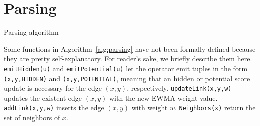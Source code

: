 \section{Parsing}
\label{sec:parsing}
\lipsum[1]

\begin{algorithm}[t]
	
	 {
		
		
		
		
		
	}
	
	\caption{Parsing algorithm}
	\label{alg:parsing}
\end{algorithm}

Some functions in Algorithm~\ref{alg:parsing} have not been formally defined because they are pretty self-explanatory. 
For reader's sake, we briefly describe them here. \texttt{emitHidden(u)} and \texttt{emitPotential(u)} let the operator emit tuples in the form \texttt{(x,y,HIDDEN)} and \texttt{(x,y,POTENTIAL)}, meaning that an hidden or potential score update is necessary for the edge $(x,y)$, respectively.
\texttt{updateLink(x,y,w)} updates the existent edge $(x,y)$ with the new EWMA weight value. 
\texttt{addLink(x,y,w)} inserts the edge $(x,y)$ with weight $w$. 
\texttt{Neighbors(x)} return the set of neighbors of $x$.

